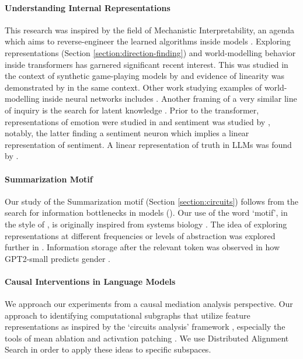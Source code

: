 \documentclass{article} %
\begin{document}
\paragraph{Understanding Internal Representations} %
This research was inspired by the field of Mechanistic Interpretability, an agenda which aims to reverse-engineer the learned algorithms inside models \citep{olah2020zoom, mathematicalframework, nanda2023grokking}. Exploring representations (Section \ref{section:direction-finding}) and world-modelling behavior inside transformers has garnered significant recent interest. This was studied in the context of synthetic game-playing models by \citet{li2023emergent} and evidence of linearity was demonstrated by \cite{nanda_othello_2023} in the same context. Other work studying examples of world-modelling inside neural networks includes \citet{li2021alchemy, patel2022mapping, abdou2021language}. Another framing of a very similar line of inquiry is the search for latent knowledge \citep{christiano2021eliciting, burns2022discovering}. Prior to the transformer, representations of emotion were studied in \citet{goh2021multimodal} and sentiment was studied by \citet{radford2017lsentiment}, notably, the latter finding a sentiment neuron which implies a linear representation of sentiment. A linear representation of truth in LLMs was found by \citet{marks2023geometry}.

\paragraph{Summarization Motif} Our study of the Summarization motif (Section \ref{section:circuits}) follows from the search for information bottlenecks in models (\cite{li2021alchemy}). Our use of the word `motif', in the style of \citet{olah2020zoom}, is originally inspired from systems biology \citep{alon2006motifs}. The idea of exploring representations at different frequencies or levels of abstraction was explored further in \citet{tamkin2020language}. Information storage after the relevant token was observed in how GPT2-small predicts gender \citep{gendered_pronouns}.

\paragraph{Causal Interventions in Language Models} %
We approach our experiments from a causal mediation analysis perspective. %
Our approach to identifying computational subgraphs that utilize feature representations as inspired by the `circuits analysis' framework \citep{heimersheim2023PythonDocstrings, deepmind2023circuit, hanna2023GreaterThan}, especially the tools of \gls{mean ablation} and \gls{activation patching}  \citep{vig2020causal, Geiger:Lu-etal:2021, Geiger-etal:2023:CA, rome, ioi, acdc, scrubbing, gevaFact}. We use Distributed Alignment Search \citep{das} in order to apply these ideas to specific subspaces.
\end{document}
